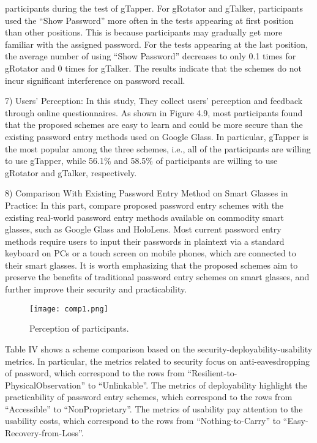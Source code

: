 \documentclass[12pt,a4paper,oneside]{report}
\begin{document}
participants during the test of gTapper. For gRotator and
gTalker, participants used the “Show Password” more often in
the tests appearing at first position than other positions. This is
because participants may gradually get more familiar with the
assigned password. For the tests appearing at the last position,
the average number of using “Show Password” decreases to
only 0.1 times for gRotator and 0 times for gTalker. The results
indicate that the schemes do not incur significant interference
on password recall.
\par 
7) Users’ Perception: In this study, They collect users’ perception and feedback through online questionnaires. As shown
in Figure 4.9, most participants found that the proposed  schemes are
easy to learn and could be more secure than the existing
password entry methods used on Google Glass. In particular,
gTapper is the most popular among the three schemes, i.e., all
of the participants are willing to use gTapper, while 56.1\% and
58.5\% of participants are willing to use gRotator and gTalker,
respectively. \newline 
\par 
8) Comparison With Existing Password Entry Method on
Smart Glasses in Practice: In this part,  compare proposed
password entry schemes with the existing real-world password
entry methods available on commodity smart glasses, such
as Google Glass and HoloLens. Most current password entry
methods require users to input their passwords in plaintext via a standard keyboard on PCs or a touch screen on
mobile phones, which are connected to their smart glasses. It is worth emphasizing that the proposed
schemes aim to preserve the benefits of traditional password
entry schemes on smart glasses, and further improve their
security and practicability.

\begin{figure}[H]
    \begin{center}
        \label{abc}
            \texttt{[image: comp1.png]}
            \caption{Perception of participants.}
    \end{center}
\end{figure}


Table IV shows a scheme comparison based on
the security-deployability-usability metrics. In particular, the metrics related
to security focus on anti-eavesdropping of password,
which correspond to the rows from “Resilient-to-PhysicalObservation” to “Unlinkable”. The metrics of deployability
highlight the practicability of password entry schemes,
which correspond to the rows from “Accessible” to “NonProprietary”. The metrics of usability pay attention to
the usability costs, which correspond to the rows from
“Nothing-to-Carry” to “Easy-Recovery-from-Loss”.
\end{document}
